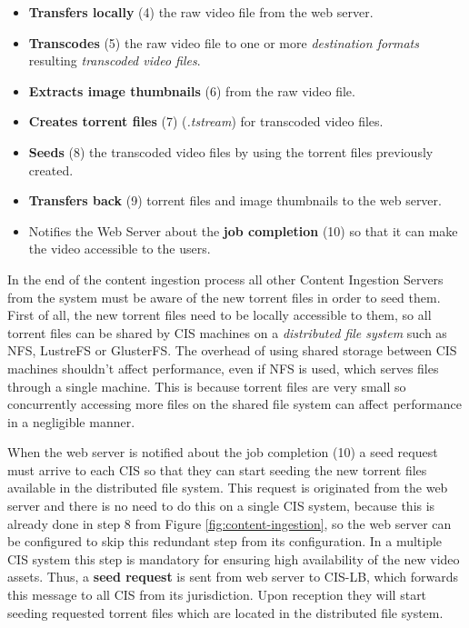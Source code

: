 \begin{itemize}
 \item \textbf{Transfers locally} (4) the raw video file from the web server.
 \item \textbf{Transcodes} (5) the raw video file to one or more \textit{destination formats} resulting \textit{transcoded video files}.
 \item \textbf{Extracts image thumbnails} (6) from the raw video file.
 \item \textbf{Creates torrent files} (7) (\textit{.tstream}) for transcoded video files.
 \item \textbf{Seeds} (8) the transcoded video files by using the torrent files previously created.
 \item \textbf{Transfers back} (9) torrent files and image thumbnails to the web server.
 \item Notifies the Web Server about the \textbf{job completion} (10) so that it can make the video accessible to the users.
\end{itemize}

In the end of the content ingestion process all other Content Ingestion Servers from the system must be aware of the new torrent files in order to seed them. First of all, the new torrent files need to be locally accessible to them, so all torrent files can be shared by CIS machines on a \textit{distributed file system} such as NFS, LustreFS or GlusterFS. The overhead of using shared storage between CIS machines shouldn't affect performance, even if NFS is used, which serves files through a single machine. This is because torrent files are very small so concurrently accessing more files on the shared file system can affect performance in a negligible manner.

When the web server is notified about the job completion (10) a seed request must arrive to each CIS so that they can start seeding the new torrent files available in the distributed file system. This request is originated from the web server and there is no need to do this on a single CIS system, because this is already done in step 8 from Figure \ref{fig:content-ingestion}, so the web server can be configured to skip this redundant step from its configuration. In a multiple CIS system this step is mandatory for ensuring high availability of the new video assets. Thus, a \textbf{seed request} is sent from web server to CIS-LB, which forwards this message to all CIS from its jurisdiction. Upon reception they will start seeding requested torrent files which are located in the distributed file system.